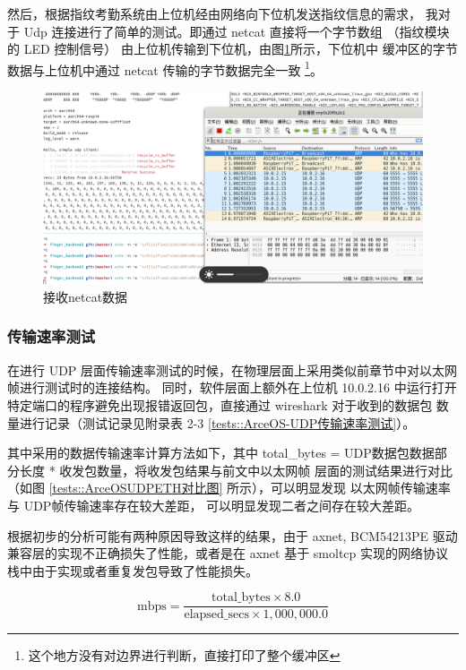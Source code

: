     然后，根据指纹考勤系统由上位机经由网络向下位机发送指纹信息的需求，
    我对于 Udp 连接进行了简单的测试。即通过 netcat 直接将一个字节数组
    （指纹模块的 LED 控制信号）
    由上位机传输到下位机，由图\ref{test::接收netcat数据}所示，下位机中
    缓冲区的字节数据与上位机中通过 netcat 传输的字节数据完全一致
    \footnote{这个地方没有对边界进行判断，直接打印了整个缓冲区}。

    \begin{figure}[H]
        \centering
        \includegraphics[width=\textwidth]{./imgs/测试-接收netcat数据.png}
        \caption{接收netcat数据}    \label{test::接收netcat数据}
    \end{figure}   

    \subsubsection{传输速率测试}
    
    在进行 UDP 层面传输速率测试的时候，在物理层面上采用类似前章节中对以太网帧进行测试时的连接结构。
    同时，软件层面上额外在上位机 10.0.2.16 中运行打开特定端口的程序避免出现报错返回包，直接通过 wireshark 对于收到的数据包
    数量进行记录（测试记录见附录表 2-3 \ref{tests::ArceOS-UDP传输速率测试}）。
    
    其中采用的数据传输速率计算方法如下，其中 total\_bytes = UDP数据包数据部分长度 * 收发包数量，将收发包结果与前文中以太网帧
    层面的测试结果进行对比（如图 \ref{tests::ArceOSUDPETH对比图} 所示），可以明显发现 以太网帧传输速率 与 UDP帧传输速率存在较大差距，
    可以明显发现二者之间存在较大差距。

    根据初步的分析可能有两种原因导致这样的结果，由于 axnet, BCM54213PE 驱动兼容层的实现不正确损失了性能，或者是在 axnet 基于
    smoltcp 实现的网络协议栈中由于实现或者重复发包导致了性能损失。
    
    $$\text{mbps} = \frac{\text{total\_bytes} \times 8.0}{\text{elapsed\_secs} \times 1,000,000.0}$$

